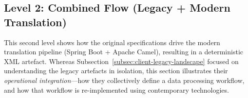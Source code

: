 \documentclass[11pt]{article}
\begin{document}
\subsection{Level 2: Combined Flow (Legacy + Modern Translation)}

This second level shows how the original specifications drive the modern translation pipeline (Spring Boot + Apache Camel), resulting in a deterministic XML artefact. Whereas Subsection~\ref{subsec:client-legacy-landscape} focused on understanding the legacy artefacts in isolation, this section illustrates their \emph{operational integration}—how they collectively define a data processing workflow, and how that workflow is re-implemented using contemporary technologies.

\vspace{0.5em}
\noindent{}
\vspace{0.5em}
\end{document}
